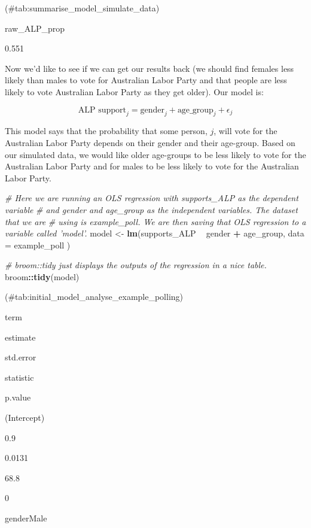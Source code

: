 \documentclass[
]{book}
\newenvironment{Shaded}{\begin{snugshade}}{\end{snugshade}}
\newcommand{\CommentTok}[1]{\textcolor[rgb]{0.56,0.35,0.01}{\textit{#1}}}
\newcommand{\DataTypeTok}[1]{\textcolor[rgb]{0.13,0.29,0.53}{#1}}
\newcommand{\KeywordTok}[1]{\textcolor[rgb]{0.13,0.29,0.53}{\textbf{#1}}}
\newcommand{\NormalTok}[1]{#1}
\newcommand{\OperatorTok}[1]{\textcolor[rgb]{0.81,0.36,0.00}{\textbf{#1}}}
\newcommand{\StringTok}[1]{\textcolor[rgb]{0.31,0.60,0.02}{#1}}
\begin{document}
(\#tab:summarise\_model\_simulate\_data)

raw\_ALP\_prop

0.551

Now we'd like to see if we can get our results back (we should find females less likely than males to vote for Australian Labor Party and that people are less likely to vote Australian Labor Party as they get older). Our model is:

\[
\mbox{ALP support}_j = \mbox{gender}_j + \mbox{age\_group}_j + \epsilon_j
\]

This model says that the probability that some person, \(j\), will vote for the Australian Labor Party depends on their gender and their age-group. Based on our simulated data, we would like older age-groups to be less likely to vote for the Australian Labor Party and for males to be less likely to vote for the Australian Labor Party.

\begin{Shaded}
\begin{Highlighting}[]
\CommentTok{# Here we are running an OLS regression with supports_ALP as the dependent variable }
\CommentTok{# and gender and age_group as the independent variables. The dataset that we are }
\CommentTok{# using is example_poll. We are then saving that OLS regression to a variable called 'model'.}
\NormalTok{model <-}\StringTok{ }\KeywordTok{lm}\NormalTok{(supports_ALP }\OperatorTok{~}\StringTok{ }\NormalTok{gender }\OperatorTok{+}\StringTok{ }\NormalTok{age_group, }
            \DataTypeTok{data =}\NormalTok{ example_poll}
\NormalTok{            )}

\CommentTok{# broom::tidy just displays the outputs of the regression in a nice table.}
\NormalTok{broom}\OperatorTok{::}\KeywordTok{tidy}\NormalTok{(model) }
\end{Highlighting}
\end{Shaded}

(\#tab:initial\_model\_analyse\_example\_polling)

term

estimate

std.error

statistic

p.value

(Intercept)

0.9~~

0.0131

68.8

0~~~~~~~~

genderMale
\end{document}
